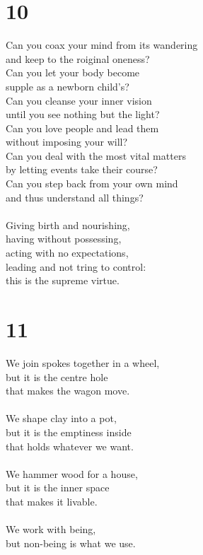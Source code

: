 \documentclass[b5paper, 12pt, oneside]{book}
\begin{document}
\chapter*{10}
Can you coax your mind from its wandering\\
and keep to the roiginal oneness?\\
Can you let your body become\\
supple as a newborn child's?\\
Can you cleanse your inner vision\\
until you see nothing but the light?\\
Can you love people and lead them\\
without imposing your will?\\
Can you deal with the most vital matters\\
by letting events take their course?\\
Can you step back from your own mind\\
and thus understand all things?\\
\\
Giving birth and nourishing,\\
having without possessing,\\
acting with no expectations,\\
leading and not tring to control:\\
this is the supreme virtue.\\

\chapter*{11}
We join spokes together in a wheel,\\
but it is the centre hole\\
that makes the wagon move.\\
\\
We shape clay into a pot,\\
but it is the emptiness inside\\
that holds whatever we want.\\
\\
We hammer wood for a house,\\
but it is the inner space\\
that makes it livable.\\
\\
We work with being,\\
but non-being is what we use.\\
\end{document}
